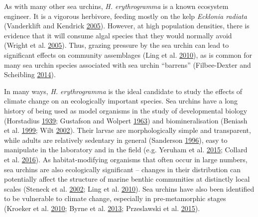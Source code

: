 \documentclass[a4paper,10pt, oneside]{memoir}
\begin{document}
As with many other sea urchins, \emph{H. erythrogramma} is a known ecosystem engineer.
It is a vigorous herbivore, feeding mostly on the kelp \emph{Ecklonia radiata} (Vanderklift and Kendrick \protect\hyperlink{ref-Vanderklift2005}{2005}).
However, at high population densities, there is evidence that it will consume algal species that they would normally avoid (Wright et al. \protect\hyperlink{ref-Wright2005}{2005}).
Thus, grazing pressure by the sea urchin can lead to significant effects on community assemblages (Ling et al. \protect\hyperlink{ref-Ling2010}{2010}), as is common for many sea urchin species associated with sea urchin ``barrens'' (Filbee-Dexter and Scheibling \protect\hyperlink{ref-Filbee-Dexter2014}{2014}).

In many ways, \emph{H. erythrogramma} is the ideal candidate to study the effects of climate change on an ecologically important species.
Sea urchins have a long history of being used as model organisms in the study of developmental biology (Horstadius \protect\hyperlink{ref-Horstadius1939}{1939}; Gustafson and Wolpert \protect\hyperlink{ref-Gustafson1963}{1963}) and biomineralisation (Beniash et al. \protect\hyperlink{ref-Beniash1999}{1999}; Wilt \protect\hyperlink{ref-Wilt2002}{2002}).
Their larvae are morphologically simple and transparent, while adults are relatively sedentary in general (Sanderson \protect\hyperlink{ref-Sanderson1996}{1996}), easy to manipulate in the laboratory and in the field (e.g. Yeruham et al. \protect\hyperlink{ref-Yeruham2015}{2015}; Collard et al. \protect\hyperlink{ref-Collard2016}{2016}).
As habitat-modifying organisms that often occur in large numbers, sea urchins are also ecologically significant -- changes in their distribution can potentially affect the structure of marine benthic communities at distinctly local scales (Steneck et al. \protect\hyperlink{ref-Steneck2002}{2002}; Ling et al. \protect\hyperlink{ref-Ling2010}{2010}).
Sea urchins have also been identified to be vulnerable to climate change, especially in pre-metamorphic stages (Kroeker et al. \protect\hyperlink{ref-Kroeker2010}{2010}; Byrne et al. \protect\hyperlink{ref-Byrne2013}{2013}; Przeslawski et al. \protect\hyperlink{ref-Przeslawski2015}{2015}).
\end{document}
